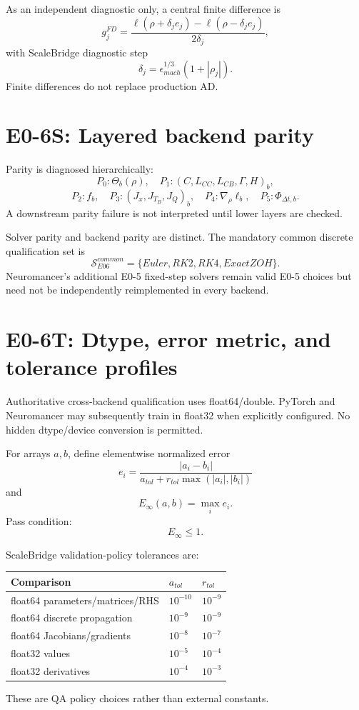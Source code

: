 \documentclass[11pt]{article}
\newcommand{\Einf}{E_{\infty}}
\begin{document}
As an independent diagnostic only, a central finite difference is
\[
\boxed{
g_j^{FD}=
\frac{\ell(\rho+\delta_je_j)-\ell(\rho-\delta_je_j)}{2\delta_j},
}
\]
with ScaleBridge diagnostic step
\[
\boxed{\delta_j=\epsilon_{mach}^{1/3}(1+|\rho_j|).}
\]
Finite differences do not replace production AD.

\section{E0-6S: Layered backend parity}

Parity is diagnosed hierarchically:
\[
P_0:\Theta_b(\rho),
\quad
P_1:(C,L_{CC},L_{CB},\Gamma,H)_b,
\]
\[
P_2:f_b,
\quad
P_3:(J_x,J_{T_B},J_Q)_b,
\quad
P_4:\nabla_\rho\ell_b,
\quad
P_5:\Phi_{\Delta t,b}.
\]
A downstream parity failure is not interpreted until lower layers are checked.

Solver parity and backend parity are distinct. The mandatory common discrete
qualification set is
\[
\boxed{\mathcal S_{E06}^{common}=\{Euler,RK2,RK4,ExactZOH\}.}
\]
Neuromancer's additional E0-5 fixed-step solvers remain valid E0-5 choices but
need not be independently reimplemented in every backend.

\section{E0-6T: Dtype, error metric, and tolerance profiles}

Authoritative cross-backend qualification uses float64/double. PyTorch and
Neuromancer may subsequently train in float32 when explicitly configured.
No hidden dtype/device conversion is permitted.

For arrays $a,b$, define elementwise normalized error
\[
e_i=\frac{|a_i-b_i|}{a_{tol}+r_{tol}\max(|a_i|,|b_i|)}
\]
and
\[
\boxed{\Einf(a,b)=\max_i e_i.}
\]
Pass condition:
\[
\boxed{\Einf\le1.}
\]

ScaleBridge validation-policy tolerances are:
\begin{center}
\begin{tabular}{lll}
\toprule
Comparison & $a_{tol}$ & $r_{tol}$\\
\midrule
float64 parameters/matrices/RHS & $10^{-10}$ & $10^{-9}$\\
float64 discrete propagation & $10^{-9}$ & $10^{-9}$\\
float64 Jacobians/gradients & $10^{-8}$ & $10^{-7}$\\
float32 values & $10^{-5}$ & $10^{-4}$\\
float32 derivatives & $10^{-4}$ & $10^{-3}$\\
\bottomrule
\end{tabular}
\end{center}
These are QA policy choices rather than external constants.
\end{document}
